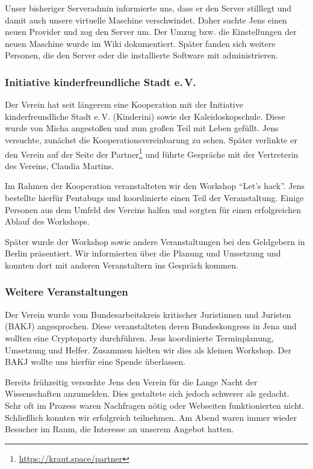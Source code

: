 \documentclass[ngerman]{scrartcl}
\begin{document}
Unser bisheriger Serveradmin informierte uns, dass er den Server stilllegt und
damit auch unsere virtuelle Maschine verschwindet. Daher suchte Jens einen neuen
Provider und zog den Server um. Der Umzug bzw. die Einstellungen der neuen
Maschine wurde im Wiki dokumentiert. Später fanden sich weitere Personen, die
den Server oder die installierte Software mit administrieren.

\subsubsection{Initiative kinderfreundliche Stadt e.\,V.}

Der Verein hat seit längerem eine Kooperation mit der Initiative
kinderfreundliche Stadt e.\,V. (Kinderini) sowie der Kaleidoskopschule. Diese
wurde von Micha angestoßen und zum großen Teil mit Leben gefüllt. Jens
versuchte, zunächst die Kooperationsvereinbarung zu sehen. Später verlinkte er
den Verein auf der Seite der Partner\footnote{\url{https://kraut.space/partner}}
und führte Gespräche mit der Vertreterin des Vereins, Claudia Martins.

Im Rahmen der Kooperation veranstalteten wir den Workshop \enquote{Let's
  hack}. Jens bestellte hierfür Pentabugs und koordinierte einen Teil der
Veranstaltung. Einige Personen aus dem Umfeld des Vereins halfen und sorgten für
einen erfolgreichen Ablauf des Workshops.

Später wurde der Workshop sowie andere Veranstaltungen bei den Geldgebern in
Berlin präsentiert. Wir informierten über die Planung und Umsetzung und konnten
dort mit anderen Veranstaltern ins Gespräch kommen.

\subsubsection{Weitere Veranstaltungen}

Der Verein wurde vom Bundesarbeitskreis kritischer Juristinnen und Juristen (BAKJ)
angesprochen. Diese veranstalteten deren Bundeskongress in Jena und wollten eine
Cryptoparty durchführen. Jens koordinierte Terminplanung, Umsetzung und
Helfer. Zusammen hielten wir dies als kleinen Workshop. Der BAKJ wollte uns
hierfür eine Spende überlassen.

Bereits frühzeitig versuchte Jens den Verein für die Lange Nacht der
Wissenschaften anzumelden. Dies gestaltete sich jedoch schwerer als
gedacht. Sehr oft im Prozess waren Nachfragen nötig oder Webseiten
funktionierten nicht. Schließlich konnten wir erfolgreich teilnehmen. Am Abend
waren immer wieder Besucher im Raum, die Interesse an unserem Angebot
hatten.
\end{document}
